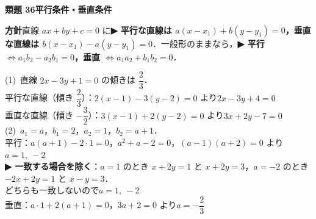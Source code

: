 \documentclass[a4paper,11pt]{ltjsarticle}
\newcommand{\ans}[2]{\Needspace{5\baselineskip}\vspace{6pt}%
  {\sffamily\bfseries 類題 #1\quad #2}\par}
\newcommand{\point}[1]{\textsf{\bfseries ▶ #1}}
\newcommand{\ax}[4]{\draw[->] (#1,0)--(#2,0) node[right]{\scriptsize $x$};
  \draw[->] (0,#3)--(0,#4) node[above]{\scriptsize $y$};
  \node[below left] at (0,0){\scriptsize O};}
\begin{document}
\ans{36}{平行条件・垂直条件}
\begin{kai}
\textbf{方針}\quad 直線 $ax+by+c=0$ に\point{平行な直線は $a(x-x_1)+b(y-y_1)=0$，垂直な直線は $b(x-x_1)-a(y-y_1)=0$}．一般形のままなら，\point{平行 $\iff a_1b_2-a_2b_1=0$，垂直 $\iff a_1a_2+b_1b_2=0$}．\\[2pt]
\begin{center}
\end{center}
(1)\ 直線 $2x-3y+1=0$ の傾きは $\dfrac23$．\\
\hspace*{1.5em}平行な直線（傾き $\dfrac23$）：$2(x-1)-3(y-2)=0$ より\quad $2x-3y+4=0$\\
\hspace*{1.5em}垂直な直線（傾き $-\dfrac32$）：$3(x-1)+2(y-2)=0$ より\quad $3x+2y-7=0$\\[2pt]
(2)\ $a_1=a$，$b_1=2$，$a_2=1$，$b_2=a+1$．\\
\hspace*{1.5em}平行：$a(a+1)-2\cdot1=0$，\quad $a^2+a-2=0$，\quad $(a-1)(a+2)=0$ より $a=1,\ -2$\\
\hspace*{1.5em}\point{一致する場合を除く}：$a=1$ のとき $x+2y=1$ と $x+2y=3$，$a=-2$ のとき $-2x+2y=1$ と $x-y=3$．\\
\hspace*{1.5em}どちらも一致しないので\quad $a=1,\ -2$\\[2pt]
\hspace*{1.5em}垂直：$a\cdot1+2(a+1)=0$，\quad $3a+2=0$ より\quad $a=-\dfrac23$
\end{kai}
\end{document}
